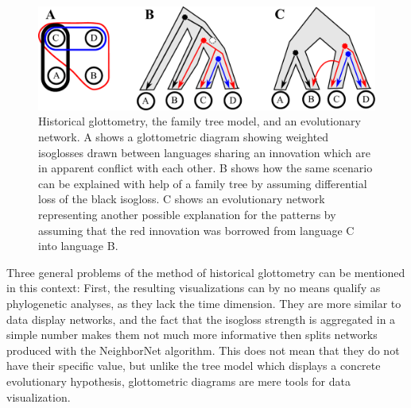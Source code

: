 \documentclass[svgnames,12pt]{scrartcl}
\begin{document}
{{\begin{figure}[htb]
  \centering
  \includegraphics[width=1\textwidth]{images/glottometrie.pdf}
  \caption{Historical glottometry, the family tree model, and an evolutionary network. A shows a glottometric diagram showing
  weighted isoglosses drawn between languages sharing an innovation which are in apparent conflict
  with each other. B shows how the same scenario can be explained with help of a family tree by
  assuming differential loss of the black isogloss. C shows an evolutionary network representing
  another possible explanation for the patterns by assuming that the red innovation was borrowed
  from language C into language B.}
  \label{fig:glotto}
\end{figure}
 
Three general problems of the method of historical glottometry can be mentioned in this context: 
First, the resulting visualizations can by no means qualify as phylogenetic analyses, as they lack
the time dimension. They are more similar to data display networks, and the fact that the isogloss
strength is aggregated in a simple number makes them not much more informative then splits
networks produced with the NeighborNet algorithm. This does not mean that they do not have their
specific value, but unlike the tree model which displays a concrete evolutionary hypothesis,
glottometric diagrams are mere tools for data visualization.
 
}}
\end{document}
